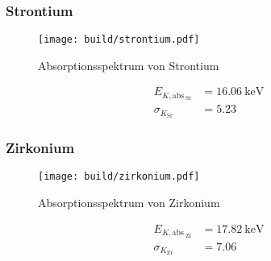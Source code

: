 \subsubsection{Strontium}
\begin{figure}
    \centering
    \caption{Absorptionsspektrum von Strontium}
    \label{fig:Strontium}
    \texttt{[image: build/strontium.pdf]}
\end{figure}
\begin{align*}
    E_{K, \text{abs}_\text{ Sr}}  &= \SI{16.06}{\kilo\electronvolt} \\
    \sigma_{K_\text{Sr}}         &= \num{5.23}
\end{align*}
\subsubsection{Zirkonium}
\begin{figure}
    \centering
    \caption{Absorptionsspektrum von Zirkonium}
    \label{fig:Zirkonium}
    \texttt{[image: build/zirkonium.pdf]}
\end{figure}
\begin{align*}
    E_{K, \text{abs}_\text{ Zr}}  &= \SI{17.82}{\kilo\electronvolt} \\
    \sigma_{K_\text{Zr}}         &= \num{7.06}
\end{align*}